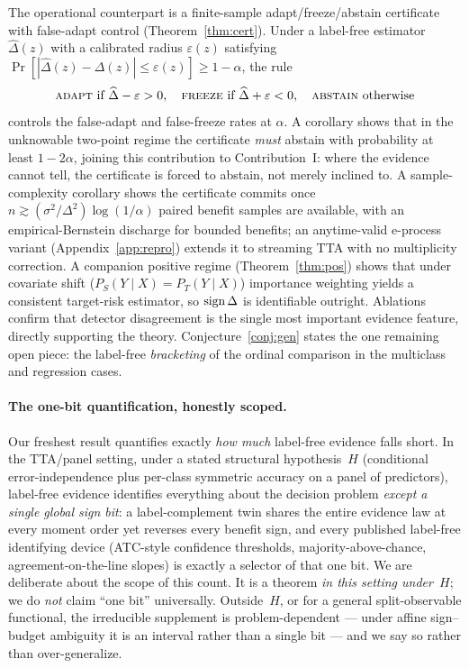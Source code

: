The operational counterpart is a finite-sample adapt/freeze/abstain certificate
with false-adapt control (Theorem~\ref{thm:cert}). Under a label-free estimator
$\widehat{\Delta}(z)$ with a calibrated radius $\varepsilon(z)$ satisfying
$\Pr[|\widehat{\Delta}(z) - \Delta(z)| \leq \varepsilon(z)] \geq 1 - \alpha$,
the rule
\[
\textsc{adapt}\ \text{if}\ \widehat{\Delta} - \varepsilon > 0,\quad
\textsc{freeze}\ \text{if}\ \widehat{\Delta} + \varepsilon < 0,\quad
\textsc{abstain}\ \text{otherwise}
\]
controls the false-adapt and false-freeze rates at $\alpha$. A corollary shows
that in the unknowable two-point regime the certificate \emph{must} abstain with
probability at least $1 - 2\alpha$, joining this contribution to Contribution~I:
where the evidence cannot tell, the certificate is forced to abstain, not merely
inclined to. A sample-complexity corollary shows the certificate commits once
$n \gtrsim (\sigma^2 / \Delta^2) \log(1/\alpha)$ paired benefit samples are
available, with an empirical-Bernstein discharge for bounded benefits; an
anytime-valid e-process variant (Appendix~\ref{app:repro}) extends it to streaming
TTA with no multiplicity correction. A companion positive regime
(Theorem~\ref{thm:pos}) shows that under covariate shift ($P_S(Y \mid X) =
P_T(Y \mid X)$) importance weighting yields a consistent target-risk estimator,
so $\operatorname{sign}\Delta$ is identifiable outright. Ablations confirm that detector
disagreement is the single most important evidence feature, directly supporting
the theory. Conjecture~\ref{conj:gen} states the one remaining open piece: the
label-free \emph{bracketing} of the ordinal comparison in the multiclass and
regression cases.

\paragraph{The one-bit quantification, honestly scoped.}
Our freshest result quantifies exactly \emph{how much} label-free evidence falls short.
In the TTA/panel setting, under a stated structural hypothesis~$H$ (conditional
error-independence plus per-class symmetric accuracy on a panel of predictors),
label-free evidence identifies everything about the decision problem \emph{except a
single global sign bit}: a label-complement twin shares the entire evidence law at every
moment order yet reverses every benefit sign, and every published label-free
identifying device (ATC-style confidence thresholds, majority-above-chance,
agreement-on-the-line slopes) is exactly a selector of that one bit. We are deliberate
about the scope of this count. It is a theorem \emph{in this setting under~$H$}; we do
\emph{not} claim ``one bit'' universally. Outside~$H$, or for a general
split-observable functional, the irreducible supplement is problem-dependent --- under
affine sign--budget ambiguity it is an interval rather than a single bit --- and we say
so rather than over-generalize.

